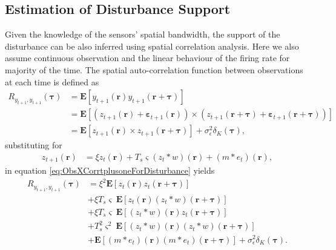 \documentclass[]{article}
\begin{document}
\subsection*{Estimation of Disturbance Support}
Given the knowledge of the sensors' spatial bandwidth, the support of the disturbance can be also inferred using spatial correlation analysis. Here we also assume continuous observation and the linear behaviour of the firing rate for majority of the time. The spatial auto-correlation function between observations at each time  is defined as 
\begin{align}
	R_{y_{t+1},y_{t+1}}(\boldsymbol{\tau}) &= \mathbf{E}\left[ y_{t+1}\left(\mathbf{r}\right) y_{t+1}\left(\mathbf{r}+\boldsymbol{\tau}\right) \right] \nonumber \\
	&= \mathbf{E}\left[\left(z_{t+1}\left(\mathbf r\right)  + \boldsymbol{\varepsilon}_{t+1}\left(\mathbf{r}\right) \right) \times \left(z_{t+1}\left(\mathbf{r}+\boldsymbol{\tau}\right)+ \boldsymbol{\varepsilon}_{t+1}\left(\mathbf{r}+\boldsymbol{\tau}\right)\right) \right] \nonumber \\
 &= \mathbf{E}\left[z_{t+1}\left(\mathbf r\right)  \times z_{t+1}\left(\mathbf{r}+\boldsymbol{\tau}\right) \right]+\sigma_{\epsilon}^2\delta_{K}\left(\boldsymbol\tau\right),\label{eq:ObsXCorrtplusoneForDisturbance}
\end{align}
substituting for
\begin{align}
z_{t+1}\left(\mathbf r\right)&=\xi z_{t}\left(\mathbf r\right)+T_s\varsigma\left(z_t \ast w\right)\left(\mathbf r\right)+\left(m\ast e_t\right)\left(\mathbf r\right),\label{eq:zvariable}
\end{align}
in equation \ref{eq:ObsXCorrtplusoneForDisturbance} yields
\begin{align}
	R_{y_{t+1},y_{t+1}}(\boldsymbol{\tau}) &=  \xi^2\mathbf{E}\left[ z_t\left(\mathbf r\right)z_t\left(\mathbf r+\boldsymbol \tau\right)\right] \nonumber \\
						&+\xi T_s\varsigma \ \mathbf{E}\left[z_t\left(\mathbf r\right)\left(z_t \ast w\right)\left(\mathbf r+\boldsymbol\tau\right)\right]\nonumber \\
						&+\xi T_s\varsigma \ \mathbf{E}\left[\left(z_t \ast w\right)\left(\mathbf r\right)z_t\left(\mathbf r+\boldsymbol\tau\right)\right]\nonumber \\
						&+T_s^2\varsigma^2 \ \mathbf{E}\left[\left(z_t \ast w\right)\left(\mathbf r\right)\left(z_t \ast w\right)\left(\mathbf r+\boldsymbol\tau\right)\right]\nonumber \\
						&+\mathbf{E}\left[\left(m \ast e_t\right)\left(\mathbf r\right)\left(m \ast e_t\right)\left(\mathbf r+\boldsymbol\tau\right)\right]+\sigma_{\epsilon}^2\delta_{K}\left(\boldsymbol\tau\right).\label{eq:AutocorrExpansionForDisturbance}
\end{align}
\end{document}
